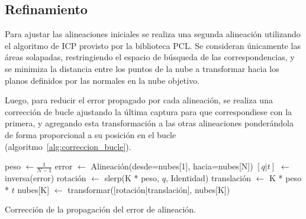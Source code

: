 

	\subsection{Refinamiento}
	Para ajustar las alineaciones iniciales se realiza una segunda alineación utilizando
	el algoritmo de ICP provisto por la biblioteca PCL.
	Se consideran únicamente las áreas solapadas, restringiendo el espacio de
	búsqueda de las correspondencias, y se minimiza la distancia entre los puntos
	de la nube a transformar hacia los planos definidos por las normales en la nube objetivo.

	Luego, para reducir el error propagado por cada alineación, se realiza una
	corrección de bucle ajustando la última captura para que correspondiese con la primera,
	y agregando esta transformación a las otras alineaciones ponderándola de forma
	proporcional a su posición en el bucle (algoritmo~\ref{alg:correccion_bucle}).

	\begin{algorithm}
		\begin{algorithmic}[1]
				\State peso $\gets \frac{1}{N-1}$
				\State error $\gets$ Alineación(desde=nubes[1], hacia=nubes[N])
				\State $[q|t]$ $\gets$ inversa(error)
					\State rotación $\gets$ slerp(K * peso, $q$, Identidad)
					\State translación $\gets$ K * peso * $t$
					\State nubes[K] $\gets$ transformar([rotación|translación], nubes[K])
				\EndFor
			\EndFunction
		\end{algorithmic}
		\caption[Corrección de la propagación del error de alineación]{\label{alg:correccion_bucle}Corrección de la propagación del error de alineación.}
	\end{algorithm}
